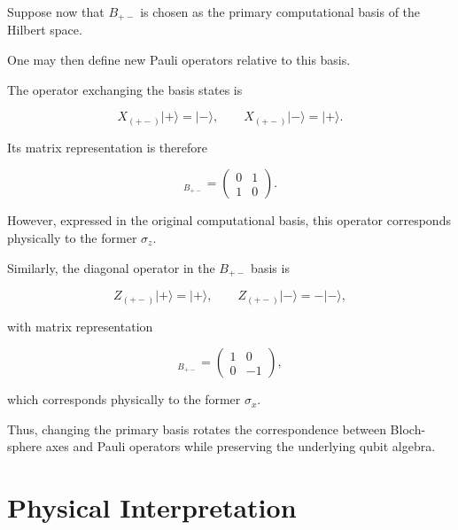 Suppose now that \( B_{+-} \) is chosen as the primary computational basis of the Hilbert space.

One may then define new Pauli operators relative to this basis.

The operator exchanging the basis states is

\begin{equation}
X_{(+-)}
|+\rangle
=
|-\rangle,
\qquad
X_{(+-)}
|-\rangle
=
|+\rangle.
\label{eq:new_x_operator_plus_minus}
\end{equation}

Its matrix representation is therefore

\begin{equation}
[X_{(+-)}]_{B_{+-}}
=
\begin{pmatrix}
0 & 1 \\
1 & 0
\end{pmatrix}.
\label{eq:new_x_matrix_plus_minus}
\end{equation}

However, expressed in the original computational basis, this operator corresponds physically to the former \( \sigma_z \).

\medskip

Similarly, the diagonal operator in the \( B_{+-} \) basis is

\begin{equation}
Z_{(+-)}
|+\rangle
=
|+\rangle,
\qquad
Z_{(+-)}
|-\rangle
=
-|-\rangle,
\label{eq:new_z_operator_plus_minus}
\end{equation}

with matrix representation

\begin{equation}
[Z_{(+-)}]_{B_{+-}}
=
\begin{pmatrix}
1 & 0 \\
0 & -1
\end{pmatrix},
\label{eq:new_z_matrix_plus_minus}
\end{equation}

which corresponds physically to the former \( \sigma_x \).

\medskip

Thus, changing the primary basis rotates the correspondence between Bloch-sphere axes and Pauli operators while preserving the underlying qubit algebra.


\section*{Physical Interpretation}

